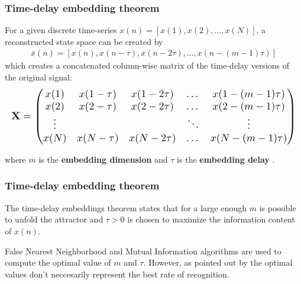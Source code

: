 \documentclass{beamer}
\begin{document}
\begin{frame}
\frametitle{Time-delay embedding theorem}


For a given discrete time-series $x(n) = [x(1) , x(2), \dots, x(N)]$,
a reconstructed state space can be created by
\begin{eqnarray*} 
\overline{x}(n) = [ x(n), x(n - \tau), x(n-2\tau), \dots , x (n-(m-1)\tau) ]
\end{eqnarray*}
which creates a concatenated column-wise matrix of the time-delay versions of the original signal:
\begin{equation}
  \resizebox{\textwidth}{!}{$\displaystyle
  \mathbf{X}
    = \begin{pmatrix} \nonumber
      x(1) & x(1 - \tau) & x(1-2\tau) & \dots & x (1-(m-1)\tau) \\
      x(2) & x(2 - \tau) & x(2-2\tau) & \dots & x (2-(m-1)\tau) \\
      \vdots &  &  & \ddots & \vdots \\
      x(N) & x(N - \tau) & x(N-2\tau) & \dots & x (N-(m-1)\tau) \\
      \end{pmatrix}
     $}
\end{equation}
        
        

where $m$ is the \textbf{ embedding dimension}  and  $\tau$ is the \textbf{ embedding delay}
\textcolor{red}{\textbf{  \cite{Takens1981} }}.




%  

\end{frame}




\begin{frame}
\frametitle{Time-delay embedding theorem}

The time-delay embeddings theorem states that for a large enough $m$ is possible to unfold the attractor 
and $\tau > 0$ is chosen to maximize the information content of $x(n)$.

False Nearest Neighborhood and Mutual Information algorithms are used to compute
the optimal value of $m$ and $\tau$. However, as pointed out by  \textcolor{red}{\textbf{ \cite{Sama2013} }}
the optimal values don't neccesarily represent the best rate of recognition.



\end{frame}
\end{document}
